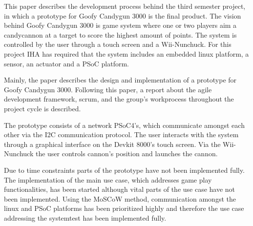 This paper describes the development process behind the third semester project, in which a prototype for Goofy Candygun 3000 is the final product. The vision behind Goofy Candygun 3000 is game system where one or two players aim a candycannon at a target to score the highest amount of points. The system is controlled by the user through a touch screen and a Wii-Nunchuck. For this project IHA has required that the system includes an embedded linux platform, a sensor, an actuator and a PSoC platform. \newline

\noindent Mainly, the paper describes the design and implementation of a prototype for Goofy Candygun 3000. Following this paper, a report about the agile development framework, scrum, and the group's workprocess throughout the project cycle is described. \newline 

\noindent The prototype consists of a network PSoC4's, which communicate amongst each other via the I2C communication protocol. The user interacts with the system through a graphical interface on the Devkit 8000's touch screen. Via the Wii-Nunchuck the user controls cannon's position and launches the cannon. \newline

\noindent Due to time constraints parts of the prototype have not been implemented fully. The implementation of the main use case, which addresses game play functionalities, has been started although vital parts of the use case have not been implemented. Using the MoSCoW method, communication amongst the linux and PSoC platforms has been prioritized highly and therefore the use case addressing the systemtest has been implemented fully.    

